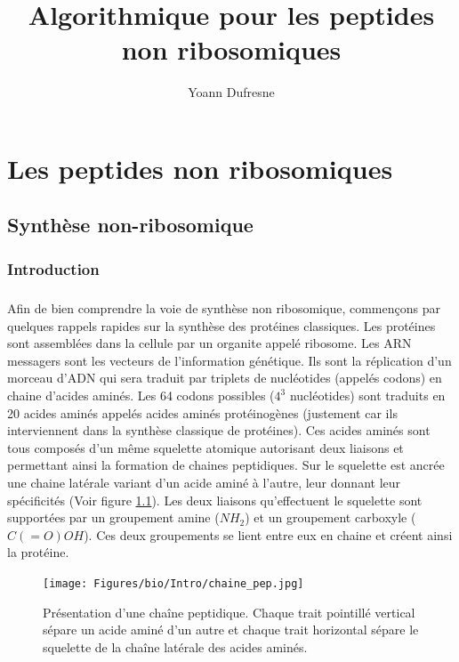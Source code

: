 \documentclass[12pt,french,twoside]{report}
\title{Algorithmique pour les peptides non ribosomiques}
\author{Yoann Dufresne}
\begin{document}
\maketitle
\tableofcontents

\chapter{Les peptides non ribosomiques}

\section{Synthèse non-ribosomique}

\subsection{Introduction}

\paragraph{}Afin de bien comprendre la voie de synthèse non ribosomique, commençons par quelques rappels rapides sur la synthèse des protéines classiques.
Les protéines sont assemblées dans la cellule par un organite appelé ribosome.
Les ARN messagers sont les vecteurs de l'information génétique.
Ils sont la réplication d'un morceau d'ADN qui sera traduit par triplets de nucléotides (appelés codons) en chaine d'acides aminés.
Les 64 codons possibles ($4^3$ nucléotides) sont traduits en 20 acides aminés appelés acides aminés protéinogènes (justement car ils interviennent dans la synthèse classique de protéines).
Ces acides aminés sont tous composés d'un même squelette atomique autorisant deux liaisons et permettant ainsi la formation de chaines peptidiques.
Sur le squelette est ancrée une chaine latérale variant d'un acide aminé à l'autre, leur donnant leur spécificités (Voir figure \ref{chaine_pep}).
Les deux liaisons qu'effectuent le squelette sont supportées par un groupement amine ($NH_2$) et un groupement carboxyle ($C(=O)OH$).
Ces deux groupements se lient entre eux en chaine et créent ainsi la protéine.

\begin{figure}[h!]
  \begin{center}
    \texttt{[image: Figures/bio/Intro/chaine\_pep.jpg]}
    \caption{\label{chaine_pep}Présentation d'une chaîne peptidique.
    Chaque trait pointillé vertical sépare un acide aminé d'un autre et chaque trait horizontal sépare le squelette de la chaîne latérale des acides aminés.}
  \end{center}
\end{figure}
\end{document}
